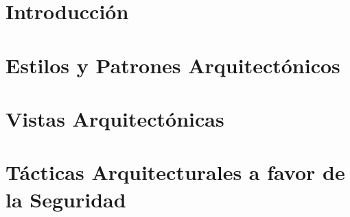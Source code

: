 \renewcommand{\contentsname}{Contenido}
\tableofcontents
\newpage

\section{Introducción}
\label{sec:intro}


\newpage 

\section{Estilos y Patrones Arquitectónicos}
\label{sec:epa}


\newpage 

\section{Vistas Arquitectónicas}\label{sec:va}


\newpage 

\section{Tácticas Arquitecturales a favor de la Seguridad}\label{sec:va}


\newpage 